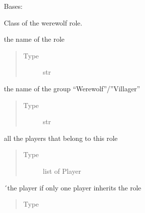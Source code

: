 \documentclass[letterpaper,10pt,english]{sphinxmanual}
\begin{document}
\begin{fulllineitems}
Bases: 

Class of the werewolf role.


\begin{fulllineitems}
the name of the role
\begin{quote}\begin{description}
\item[{Type}] \leavevmode
str

\end{description}\end{quote}

\end{fulllineitems}



\begin{fulllineitems}
the name of the group “Werewolf”/”Villager”
\begin{quote}\begin{description}
\item[{Type}] \leavevmode
str

\end{description}\end{quote}

\end{fulllineitems}



\begin{fulllineitems}
all the players that belong to this role
\begin{quote}\begin{description}
\item[{Type}] \leavevmode
list of Player

\end{description}\end{quote}

\end{fulllineitems}



\begin{fulllineitems}
´the player if only one player inherits the role
\begin{quote}\begin{description}
\item[{Type}] \leavevmode
{\hyperref[\detokenize{chatwolf:chatwolf.player.Player}]{}}


\end{description}
\end{quote}
\end{fulllineitems}
\end{fulllineitems}
\end{document}
